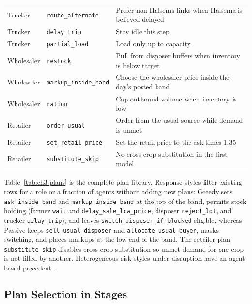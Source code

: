 \documentclass{icsthesis}
\begin{document}
\begin{mainmatter}
\begin{longtable}[l]{@{}>{\raggedright\arraybackslash}p{}>{\raggedright\arraybackslash}p{}>{\raggedright\arraybackslash}p{}@{}}
			Trucker & \texttt{route\_alternate} & Prefer non-Halsema links when Halsema is believed delayed \\
			Trucker & \texttt{delay\_trip} & Stay idle this step \\
			Trucker & \texttt{partial\_load} & Load only up to capacity \\
			Wholesaler & \texttt{restock} & Pull from disposer buffers when inventory is below target \\
			Wholesaler & \texttt{markup\_inside\_band} & Choose the wholesaler price inside the day's posted band \\
			Wholesaler & \texttt{ration} & Cap outbound volume when inventory is low \\
			Retailer & \texttt{order\_usual} & Order from the usual source while demand is unmet \\
			Retailer & \texttt{set\_retail\_price} & Set the retail price to the ask times 1.35 \\
			Retailer & \texttt{substitute\_skip} & No cross-crop substitution in the first model \\
			\end{longtable}
			\endgroup

			Table~\ref{tab:ch3-plans} is the complete plan library. Response styles filter existing rows for a role or a fraction of agents without adding new plans: Greedy sets \texttt{ask\_inside\_band} and \texttt{markup\_inside\_band} at the top of the band, permits stock holding (farmer \texttt{wait} and \texttt{delay\_sale\_low\_price}, disposer \texttt{reject\_lot}, and trucker \texttt{delay\_trip}), and leaves \texttt{switch\_disposer\_if\_blocked} eligible, whereas Passive keeps \texttt{sell\_usual\_disposer} and \texttt{allocate\_usual\_buyer}, masks switching, and places markups at the low end of the band. The retailer plan \texttt{substitute\_skip} disables cross-crop substitution so unmet demand for one crop is not filled by another. Heterogeneous risk styles under disruption have an agent-based precedent \citep{Aghaie2019}.

		\subsection{Plan Selection in Stages}


\end{mainmatter}
\end{document}
